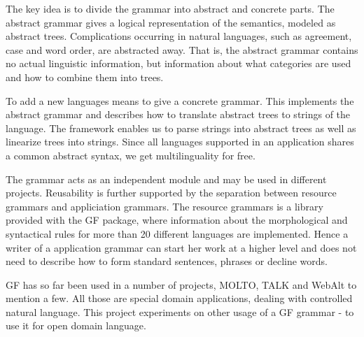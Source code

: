 \documentclass[submission]{eptcs} %
\begin{document}
The key idea
is to divide the grammar into abstract and concrete parts. %
The abstract grammar gives a logical representation of the semantics,
modeled as abstract trees. Complications occurring in
natural languages, such as agreement, case and word order, are abstracted away. 
That is, the abstract grammar contains no actual linguistic information, but
information about what categories are used and how to combine them into trees.

To add a new languages means to give a concrete grammar. This implements
the abstract grammar and describes how to translate abstract
trees to strings of the language. The framework enables us to parse strings into 
abstract trees as well as linearize trees into strings.
Since all languages supported in an application shares a common abstract syntax,
we get multilinguality for free.

The grammar acts as an independent module and may be used in different
projects.
Reusability is further supported by the separation between resource grammars
and appliciation grammars. The resource grammars is 
a library provided with the GF package, 
where information about the morphological and
syntactical rules for more than 20 different languages are implemented.
Hence a writer of a application grammar can start her work at a higher
level and does not need to describe how to 
form standard sentences, phrases or decline words.

GF has so far been used in a number of projects, MOLTO\cite{molto}, TALK\cite{talk}
and WebAlt\cite{webalt} to mention a few. 
All those are special domain applications, dealing with controlled natural
language.
This project experiments on other usage of a GF grammar - to use it for open
domain language.

\end{document}
